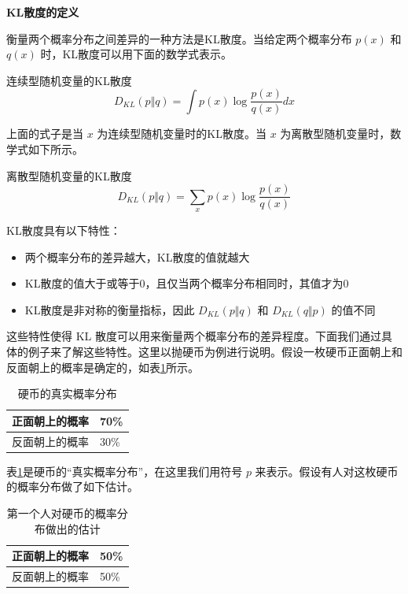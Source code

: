 \documentclass[lang=cn,newtx,10pt,scheme=chinese]{elegantbook}
\begin{document}
\textbf{KL散度的定义}

衡量两个概率分布之间差异的一种方法是KL散度。当给定两个概率分布 $p(x)$ 和 $q(x)$ 时，KL散度可以用下面的数学式表示。

\begin{definition}{连续型随机变量的KL散度}{}
\begin{equation}
D_{KL}(p\Vert q)=\int p(x)\log\frac{p(x)}{q(x)}dx
\end{equation}
\end{definition}

上面的式子是当 $x$ 为连续型随机变量时的KL散度。当 $x$ 为离散型随机变量时，数学式如下所示。

\begin{definition}{离散型随机变量的KL散度}{}
\begin{equation}
D_{KL}(p\Vert q)=\sum_x p(x)\log\frac{p(x)}{q(x)}
\end{equation}
\end{definition}

KL散度具有以下特性：

\begin{itemize}
\item 两个概率分布的差异越大，KL散度的值就越大
\item KL散度的值大于或等于0，且仅当两个概率分布相同时，其值才为0
\item KL散度是非对称的衡量指标，因此 $D_{KL}(p\Vert q)$ 和 $D_{KL}(q\Vert p)$ 的值不同
\end{itemize}

这些特性使得 KL 散度可以用来衡量两个概率分布的差异程度。下面我们通过具体的例子来了解这些特性。这里以抛硬币为例进行说明。假设一枚硬币正面朝上和反面朝上的概率是确定的，如表\ref{tbl:real-coin-distribution}所示。

\begin{table}[!ht]
\centering
\begin{tabular}{|l|l|}
\hline
正面朝上的概率 & 70\% \\ \hline
反面朝上的概率 & 30\% \\ \hline
\end{tabular}
\caption{硬币的真实概率分布}\label{tbl:real-coin-distribution}
\end{table}

表\ref{tbl:real-coin-distribution}是硬币的``真实概率分布''，在这里我们用符号 $p$ 来表示。假设有人对这枚硬币的概率分布做了如下估计。

\begin{table}[!ht]
\centering
\begin{tabular}{|l|l|}
\hline
正面朝上的概率 & 50\% \\ \hline
反面朝上的概率 & 50\% \\ \hline
\end{tabular}
\caption{第一个人对硬币的概率分布做出的估计}\label{tbl:estimate-coin-1}
\end{table}
\end{document}
